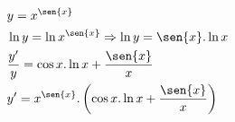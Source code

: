 \begin{ex}
\begin{align}
&y=x^{\sen{x}}\nonumber\\
&\ln{y}=\ln{x^{\sen{x}}} \Rightarrow \ln{y}=\sen{x}.\ln{x}\nonumber\\
&\frac{y'}{y}=\cos{x}.\ln{x}+\frac{\sen{x}}{x}\nonumber\\
&y'=x^{\sen{x}}.\left(\cos{x}.\ln{x}+\frac{\sen{x}}{x}\right)\nonumber
\end{align}
\end{ex}
